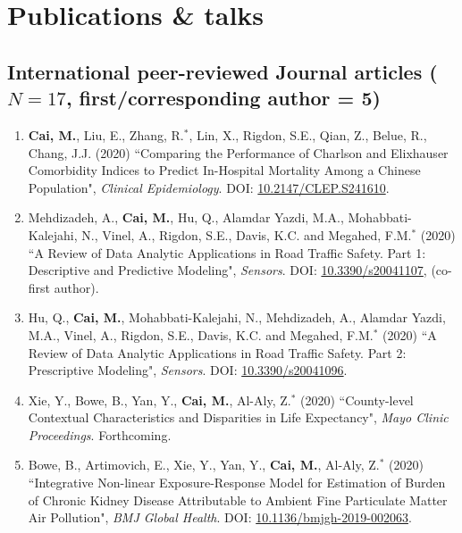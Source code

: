 \documentclass[11pt, a4paper]{article}
\newcommand{\years}[1]{\marginnote{\scriptsize #1}}
\begin{document}
	
	

	\section*{Publications \& talks}
	\subsection*{International peer-reviewed Journal articles ($N=17$, first/corresponding author = 5)}
	\begin{enumerate}[leftmargin=0ex,itemsep=1ex]
		\item \years{2020}\textbf{Cai, M.}, Liu, E., Zhang, R.$^\ast$, Lin, X., Rigdon, S.E., Qian, Z., Belue, R., Chang, J.J. (2020) ``Comparing the Performance of Charlson and Elixhauser Comorbidity Indices to Predict In-Hospital Mortality Among a Chinese Population", \emph{Clinical Epidemiology}. DOI: \href{https://doi.org/10.2147/CLEP.S241610}{10.2147/CLEP.S241610}.
		
		\item Mehdizadeh, A., \textbf{Cai, M.}, Hu, Q., Alamdar Yazdi, M.A., Mohabbati-Kalejahi, N., Vinel, A., Rigdon, S.E., Davis, K.C. and Megahed, F.M.$^\ast$ (2020) ``A Review of Data Analytic Applications in Road Traffic Safety. Part 1: Descriptive and Predictive Modeling", \emph{Sensors}. DOI: \href{https://doi.org/10.3390/s20041107}{10.3390/s20041107}, (co-first author).
		
		\item Hu, Q., \textbf{Cai, M.}, Mohabbati-Kalejahi, N., Mehdizadeh, A., Alamdar Yazdi, M.A., Vinel, A., Rigdon, S.E., Davis, K.C. and Megahed, F.M.$^\ast$ (2020) ``A Review of Data Analytic Applications in Road Traffic Safety. Part 2: Prescriptive Modeling", \emph{Sensors}. DOI: \href{https://doi.org/10.3390/s20041096}{10.3390/s20041096}.
		
		\item Xie, Y., Bowe, B., Yan, Y., \textbf{Cai, M.}, Al-Aly, Z.$^\ast$ (2020) ``County-level Contextual Characteristics and Disparities in Life Expectancy", \emph{Mayo Clinic Proceedings}. Forthcoming.
		
		\item Bowe, B., Artimovich, E., Xie, Y., Yan, Y., \textbf{Cai, M.}, Al-Aly, Z.$^\ast$ (2020) ``Integrative Non-linear Exposure-Response Model for Estimation of Burden of Chronic Kidney Disease Attributable to Ambient Fine Particulate Matter Air Pollution", \emph{BMJ Global Health}. DOI: \href{https://doi.org/10.1136/bmjgh-2019-002063}{10.1136/bmjgh-2019-002063}.
		

\end{enumerate}
\end{document}
